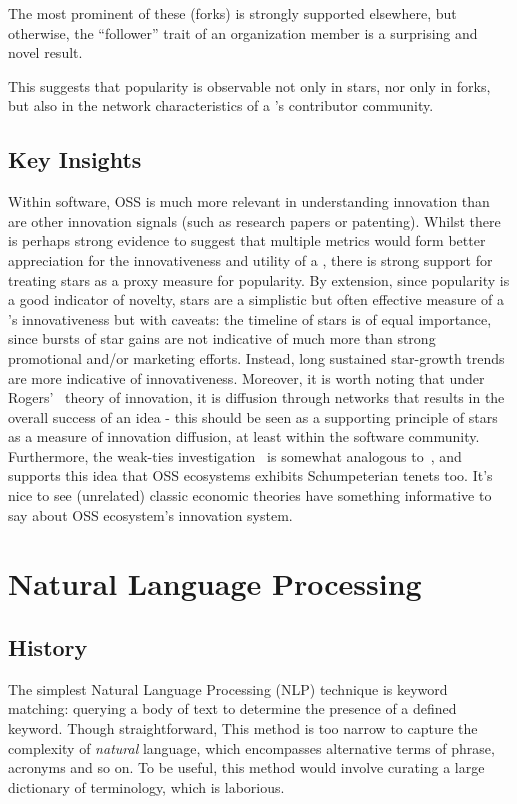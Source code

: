 The most prominent of these (forks) is strongly supported elsewhere, but otherwise, the ``follower'' trait of an organization member is a surprising and novel result.

This suggests that popularity is observable not only in stars, nor only in forks, but also in the network characteristics of a \repo{}'s contributor community.

\subsection{Key Insights}

Within software, OSS is much more relevant in understanding innovation than are other innovation signals (such as research papers or patenting).
Whilst there is perhaps strong evidence to suggest that multiple metrics would form better appreciation for the innovativeness and utility of a \ghrepo{}, there is strong support for treating stars as a proxy measure for popularity.
By extension, since popularity is a good indicator of novelty, stars are a simplistic but often effective measure of a \repo{}'s innovativeness but with caveats: the timeline of stars is of equal importance, since bursts of star gains are not indicative of much more than strong promotional and/or marketing efforts. Instead, long sustained star-growth trends are more indicative of innovativeness.
Moreover, it is worth noting that under Rogers'~\cite{rogers_1983_DiffusionInnovations} theory of innovation, it is diffusion through networks that results in the overall success of an idea - this should be seen as a supporting principle of stars as a measure of innovation diffusion, at least within the software community.
Furthermore, the weak-ties investigation~\cite{fang_2024_WeakTies} is somewhat analogous to~\cite{uzzi_2013_AtypicalCombinations}, and supports this idea that OSS ecosystems exhibits Schumpeterian tenets too. It's nice to see (unrelated) classic economic theories have something informative to say about OSS ecosystem's innovation system.

\section{Natural Language Processing}

\subsection{History}

The simplest Natural Language Processing (NLP) technique is keyword matching: querying a body of text to determine the presence of a defined keyword.
Though straightforward, This method is too narrow to capture the complexity of \emph{natural} language, which encompasses alternative terms of phrase, acronyms and so on.
To be useful, this method would involve curating a large dictionary of terminology, which is laborious.

